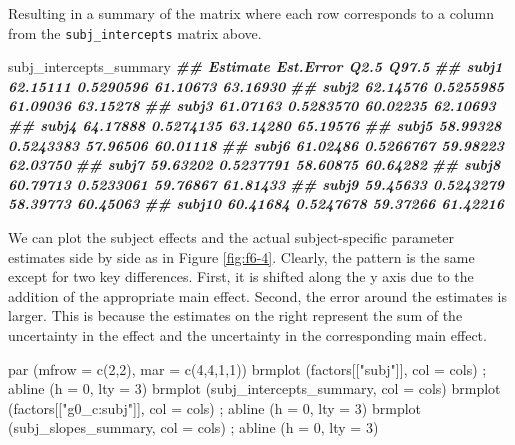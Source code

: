 \documentclass[
]{book}
\newenvironment{Shaded}{\begin{snugshade}}{\end{snugshade}}
\newcommand{\AttributeTok}[1]{\textcolor[rgb]{0.77,0.63,0.00}{#1}}
\newcommand{\DecValTok}[1]{\textcolor[rgb]{0.00,0.00,0.81}{#1}}
\newcommand{\DocumentationTok}[1]{\textcolor[rgb]{0.56,0.35,0.01}{\textbf{\textit{#1}}}}
\newcommand{\FunctionTok}[1]{\textcolor[rgb]{0.00,0.00,0.00}{#1}}
\newcommand{\NormalTok}[1]{#1}
\newcommand{\StringTok}[1]{\textcolor[rgb]{0.31,0.60,0.02}{#1}}
\begin{document}
Resulting in a summary of the matrix where each row corresponds to a column from the \texttt{subj\_intercepts} matrix above.

\begin{Shaded}
\begin{Highlighting}[]
\NormalTok{subj\_intercepts\_summary}
\DocumentationTok{\#\#        Estimate Est.Error     Q2.5    Q97.5}
\DocumentationTok{\#\# subj1  62.15111 0.5290596 61.10673 63.16930}
\DocumentationTok{\#\# subj2  62.14576 0.5255985 61.09036 63.15278}
\DocumentationTok{\#\# subj3  61.07163 0.5283570 60.02235 62.10693}
\DocumentationTok{\#\# subj4  64.17888 0.5274135 63.14280 65.19576}
\DocumentationTok{\#\# subj5  58.99328 0.5243383 57.96506 60.01118}
\DocumentationTok{\#\# subj6  61.02486 0.5266767 59.98223 62.03750}
\DocumentationTok{\#\# subj7  59.63202 0.5237791 58.60875 60.64282}
\DocumentationTok{\#\# subj8  60.79713 0.5233061 59.76867 61.81433}
\DocumentationTok{\#\# subj9  59.45633 0.5243279 58.39773 60.45063}
\DocumentationTok{\#\# subj10 60.41684 0.5247678 59.37266 61.42216}
\end{Highlighting}
\end{Shaded}

We can plot the subject effects and the actual subject-specific parameter estimates side by side as in Figure \ref{fig:f6-4}. Clearly, the pattern is the same except for two key differences. First, it is shifted along the y axis due to the addition of the appropriate main effect. Second, the error around the estimates is larger. This is because the estimates on the right represent the sum of the uncertainty in the effect and the uncertainty in the corresponding main effect.

\begin{Shaded}
\begin{Highlighting}[]
\FunctionTok{par}\NormalTok{ (}\AttributeTok{mfrow =} \FunctionTok{c}\NormalTok{(}\DecValTok{2}\NormalTok{,}\DecValTok{2}\NormalTok{), }\AttributeTok{mar =} \FunctionTok{c}\NormalTok{(}\DecValTok{4}\NormalTok{,}\DecValTok{4}\NormalTok{,}\DecValTok{1}\NormalTok{,}\DecValTok{1}\NormalTok{))}
\FunctionTok{brmplot}\NormalTok{ (factors[[}\StringTok{"subj"}\NormalTok{]], }\AttributeTok{col =}\NormalTok{ cols) ; }\FunctionTok{abline}\NormalTok{ (}\AttributeTok{h =} \DecValTok{0}\NormalTok{, }\AttributeTok{lty =} \DecValTok{3}\NormalTok{)}
\FunctionTok{brmplot}\NormalTok{ (subj\_intercepts\_summary, }\AttributeTok{col =}\NormalTok{ cols)}
\FunctionTok{brmplot}\NormalTok{ (factors[[}\StringTok{"g0\_c:subj"}\NormalTok{]], }\AttributeTok{col =}\NormalTok{ cols) ; }\FunctionTok{abline}\NormalTok{ (}\AttributeTok{h =} \DecValTok{0}\NormalTok{, }\AttributeTok{lty =} \DecValTok{3}\NormalTok{)}
\FunctionTok{brmplot}\NormalTok{ (subj\_slopes\_summary, }\AttributeTok{col =}\NormalTok{ cols) ; }\FunctionTok{abline}\NormalTok{ (}\AttributeTok{h =} \DecValTok{0}\NormalTok{, }\AttributeTok{lty =} \DecValTok{3}\NormalTok{)}
\end{Highlighting}
\end{Shaded}
\end{document}
